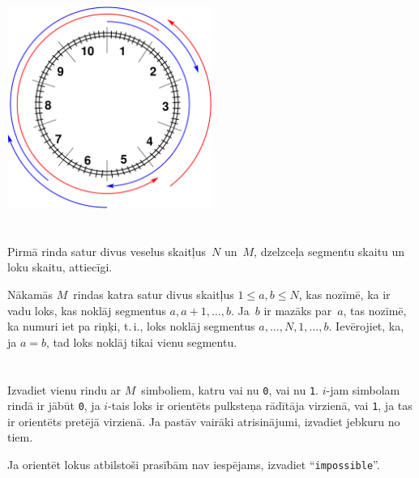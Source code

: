 \vspace{2mm}
\begin{center}
\includegraphics[width=0.5\textwidth]{alternatingfig.pdf}
\end{center}
\vspace{1mm}

\section*{}
Pirmā rinda satur divus veselus skaitļus~$N$ un~$M$, dzelzceļa segmentu skaitu un loku skaitu, attiecīgi.

Nākamās $M$~rindas katra satur divus skaitļus $1 \le a, b \le N$, kas nozīmē, ka ir vadu loks, kas
noklāj segmentus $a, a+1, \dots, b$. Ja~$b$ ir mazāks par~$a$, tas nozīmē, ka numuri iet pa riņķi,
t.\,i., loks noklāj segmentus $a, \dots, N, 1, \dots, b$. Ievērojiet, ka, ja $a=b$, tad loks noklāj
tikai vienu segmentu.

\section*{\outputsection}
Izvadiet vienu rindu ar $M$~simboliem, katru vai nu \texttt{0}, vai nu \texttt{1}. $i$-jam simbolam rindā
ir jābūt \texttt{0}, ja $i$-tais loks ir orientēts pulksteņa rādītāja virzienā, vai \texttt{1}, ja tas ir orientēts
pretējā virzienā. Ja pastāv vairāki atrisinājumi, izvadiet jebkuru no tiem.

Ja orientēt lokus atbilstoši prasībām nav iespējams, izvadiet ``\texttt{impossible}''.


